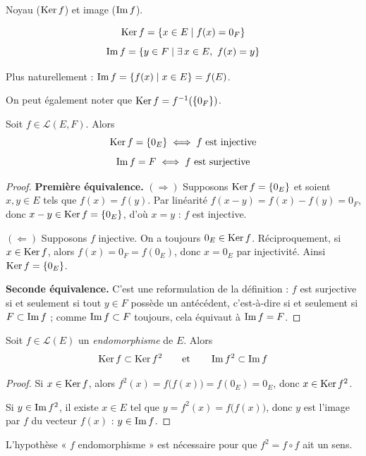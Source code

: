 Noyau ($\operatorname{Ker} f$) et image ($\operatorname{Im} f$).

\begin{defi}
\[\operatorname{Ker} f = \{x\in E \mid f(x)=0_F\}\]
\[\operatorname{Im} f = \{y\in F \mid \exists\, x\in E,\ f(x)=y\}\]
\end{defi}

Plus naturellement : $\operatorname{Im} f = \{f(x) \mid x\in E\} = f(E)$.

On peut également noter que $\operatorname{Ker} f = f^{-1}(\{0_F\})$.

\begin{prop}
\label{prop:ker-im}
Soit $f\in\mathcal{L}(E,F)$. Alors
\[\operatorname{Ker} f = \{0_E\} \iff f \text{ est injective}\]
\[\operatorname{Im} f = F \iff f \text{ est surjective}\]
\end{prop}

\begin{proof}
\textbf{Première équivalence.} $(\Rightarrow)$ Supposons $\operatorname{Ker} f=\{0_E\}$ et soient $x,y\in E$ tels que $f(x)=f(y)$. Par linéarité $f(x-y)=f(x)-f(y)=0_F$, donc $x-y\in\operatorname{Ker} f=\{0_E\}$, d'où $x=y$ : $f$ est injective.

$(\Leftarrow)$ Supposons $f$ injective. On a toujours $0_E\in\operatorname{Ker} f$. Réciproquement, si $x\in\operatorname{Ker} f$, alors $f(x)=0_F=f(0_E)$, donc $x=0_E$ par injectivité. Ainsi $\operatorname{Ker} f=\{0_E\}$.

\textbf{Seconde équivalence.} C'est une reformulation de la définition : $f$ est surjective si et seulement si tout $y\in F$ possède un antécédent, c'est-à-dire si et seulement si $F\subset\operatorname{Im} f$ ; comme $\operatorname{Im} f\subset F$ toujours, cela équivaut à $\operatorname{Im} f=F$.
\end{proof}

\begin{prop}
Soit $f\in\mathcal{L}(E)$ un \emph{endomorphisme} de $E$. Alors
\[\operatorname{Ker} f \subset \operatorname{Ker} f^2 \qquad\text{et}\qquad \operatorname{Im} f^2 \subset \operatorname{Im} f\]
\end{prop}

\begin{proof}
Si $x\in\operatorname{Ker} f$, alors $f^2(x)=f\big(f(x)\big)=f(0_E)=0_E$, donc $x\in\operatorname{Ker} f^2$.

Si $y\in\operatorname{Im} f^2$, il existe $x\in E$ tel que $y=f^2(x)=f\big(f(x)\big)$, donc $y$ est l'image par $f$ du vecteur $f(x)$ : $y\in\operatorname{Im} f$.
\end{proof}

\begin{remarque}
L'hypothèse « $f$ endomorphisme » est nécessaire pour que $f^2=f\circ f$ ait un sens.
\end{remarque}

